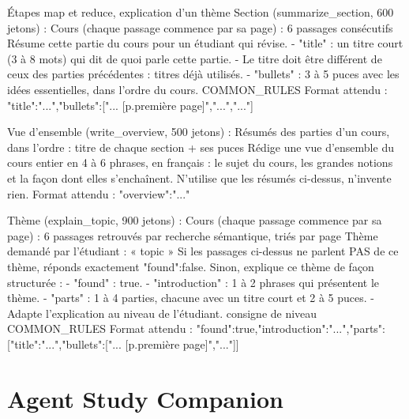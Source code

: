 \documentclass[12pt,a4paper]{report}
\begin{document}
\begin{prompt}{Étapes map et reduce, explication d'un thème}
Section (summarize_section, 600 jetons) :
Cours (chaque passage commence par sa page) :
{6 passages consécutifs}
Résume cette partie du cours pour un étudiant qui révise.
- "title" : un titre court (3 à 8 mots) qui dit de quoi parle cette partie.
- Le titre doit être différent de ceux des parties précédentes : {titres déjà utilisés}.
- "bullets" : 3 à 5 puces avec les idées essentielles, dans l'ordre du cours.
{COMMON_RULES}
Format attendu :
{"title":"...","bullets":["... [p.{première page}]","...","..."]}

Vue d'ensemble (write_overview, 500 jetons) :
Résumés des parties d'un cours, dans l'ordre :
{titre de chaque section + ses puces}
Rédige une vue d'ensemble du cours entier en 4 à 6 phrases, en français : le sujet du cours, les
grandes notions et la façon dont elles s'enchaînent. N'utilise que les résumés ci-dessus,
n'invente rien.
Format attendu :
{"overview":"..."}

Thème (explain_topic, 900 jetons) :
Cours (chaque passage commence par sa page) :
{6 passages retrouvés par recherche sémantique, triés par page}
Thème demandé par l'étudiant : « {topic} »
Si les passages ci-dessus ne parlent PAS de ce thème, réponds exactement {"found":false}.
Sinon, explique ce thème de façon structurée :
- "found" : true.
- "introduction" : 1 à 2 phrases qui présentent le thème.
- "parts" : 1 à 4 parties, chacune avec un titre court et 2 à 5 puces.
- Adapte l'explication au niveau de l'étudiant. {consigne de niveau}
{COMMON_RULES}
Format attendu :
{"found":true,"introduction":"...","parts":[{"title":"...","bullets":["... [p.{première page}]","..."]}]}
\end{prompt}

\section{Agent Study Companion}
\end{document}
